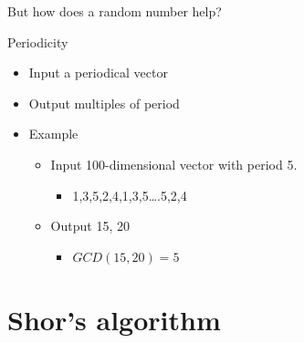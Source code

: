 \begin{frame}{But how does a random number help?}

\begin{block}{Periodicity}

\begin{itemize}
\item
  Input a periodical vector
\item
  Output multiples of period
\item
  Example

  \begin{itemize}
  \itemsep1pt\parskip0pt
  \item
    Input 100-dimensional vector with period 5.

    \begin{itemize}
    \itemsep1pt\parskip0pt
    \item
      1,3,5,2,4,1,3,5\ldots{}.5,2,4
    \end{itemize}
  \item
    Output 15, 20

    \begin{itemize}
    \itemsep1pt\parskip0pt
    \item
      $GCD(15,20)=5$
    \end{itemize}
  \end{itemize}
\end{itemize}

\end{block}

\end{frame}

\section{Shor's algorithm}\label{shors-algorithm}

